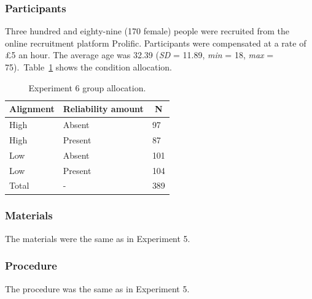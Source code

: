 \documentclass[a4paper, nobind, dvipsnames]{templates/ociamthesis}
\theoremstyle{definition}
\theoremstyle{definition}
\theoremstyle{definition}
\theoremstyle{definition}
\theoremstyle{remark}
\begin{document}
\hypertarget{participants-12}{%
\subsubsection{Participants}\label{participants-12}}

Three hundred and eighty-nine (170 female) people were recruited from the online recruitment platform Prolific. Participants were compensated at a rate of £5 an hour. The average age was 32.39 (\emph{SD} = 11.89, \emph{min} = 18, \emph{max} = 75).~Table~\ref{tab:condition-allocation-alignment-5}
shows the condition allocation.

\begin{table}[tbp]

\begin{center}
\begin{threeparttable}

\caption{\label{tab:condition-allocation-alignment-5}Experiment 6 group allocation.}

\begin{tabular}{lll}
\toprule
Alignment & \multicolumn{1}{c}{Reliability amount} & \multicolumn{1}{c}{N}\\
\midrule
High & Absent & 97\\
High & Present & 87\\
Low & Absent & 101\\
Low & Present & 104\\
Total & - & 389\\
\bottomrule
\end{tabular}

\end{threeparttable}
\end{center}

\end{table}

\hypertarget{materials-14}{%
\subsubsection{Materials}\label{materials-14}}

The materials were the same as in Experiment 5.

\hypertarget{procedure-10}{%
\subsubsection{Procedure}\label{procedure-10}}

The procedure was the same as in Experiment 5.
\end{document}
